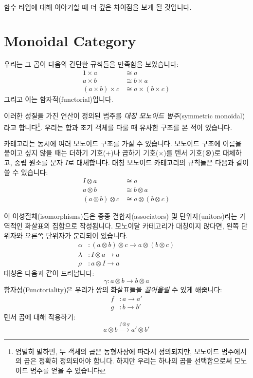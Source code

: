 \documentclass[DaoFP]{subfiles}
\begin{document}
함수 타입에 대해 이야기할 때 더 깊은 차이점을 보게 될 것입니다.

\section{Monoidal Category}

우리는 그 곱이 다음의 간단한 규칙들을 만족함을 보았습니다:
\begin{align*}
1 \times a &\cong a
\\
a \times b &\cong b \times a
\\
(a \times b) \times c &\cong a \times (b \times c)
\end{align*}
그리고 이는 함자적(functorial)입니다.

이러한 성질을 가진 연산이 정의된 범주를 \emph{대칭 모노이드 범주}(symmetric monoidal)라고 합니다\footnote{엄밀히 말하면, 두 객체의 곱은 동형사상에 따라서 정의되지만, 모노이드 범주에서의 곱은 정확히 정의되어야 합니다. 하지만 우리는 하나의 곱을 선택함으로써 모노이드 범주를 얻을 수 있습니다}. 우리는 합과 초기 객체를 다룰 때 유사한 구조를 본 적이 있습니다.

카테고리는 동시에 여러 모노이드 구조를 가질 수 있습니다. 모노이드 구조에 이름을 붙이고 싶지 않을 때는 더하기 기호(+)나 곱하기 기호(×)를 텐서 기호(⊗)로 대체하고, 중립 원소를 문자 $I$로 대체합니다. 대칭 모노이드 카테고리의 규칙들은 다음과 같이 쓸 수 있습니다:
\begin{align*}
I \otimes a &\cong a
\\
a \otimes b &\cong b \otimes a
\\
(a \otimes b) \otimes c &\cong a \otimes (b \otimes c)
\end{align*}

이 이성질체(isomorphisms)들은 종종 결합자(associators) 및 단위자(unitors)라는 가역적인 화살표의 집합으로 작성됩니다. 모노이달 카테고리가 대칭이지 않다면, 왼쪽 단위자와 오른쪽 단위자가 분리되어 있습니다.
\begin{align*}
\alpha &\colon (a \otimes b) \otimes c \to a \otimes (b \otimes c)
\\
 \lambda &\colon I \otimes a \to a
 \\
 \rho &\colon a \otimes I \to a
\end{align*}
대칭은 다음과 같이 드러납니다:
\[ \gamma \colon a \otimes b \to b \otimes a \]
함자성(Functoriality)은 우리가 쌍의 화살표들을 \emph{끌어올릴} 수 있게 해줍니다:
\begin{align*} 
f &\colon a \to a' \\
g &\colon b \to b'
\end{align*}
텐서 곱에 대해 작용하기:
\[ a \otimes b \xrightarrow{f \otimes g} a' \otimes b' \]
\end{document}
